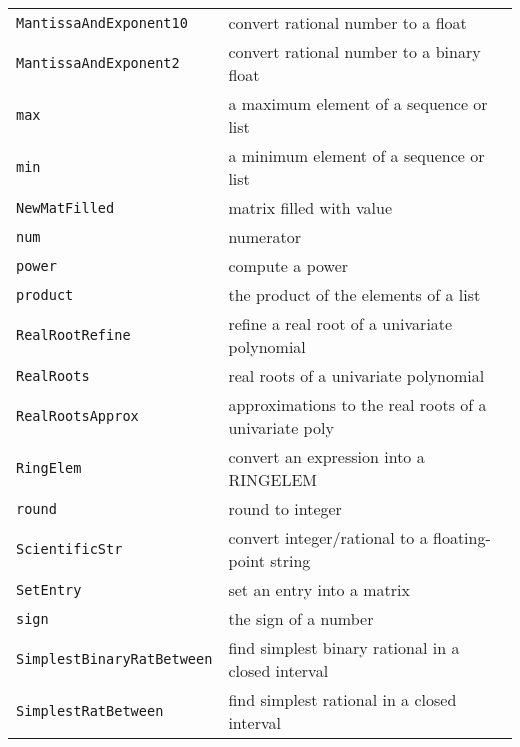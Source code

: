 \documentclass[a4paper]{mybook}
\begin{document}
\begin{center}
\begin{longtable}{ll}
{\verb~MantissaAndExponent10~} &
      convert rational number to a float\\
   
{\verb~MantissaAndExponent2~} &
      convert rational number to a binary float\\
   
{\verb~max~} &
      a maximum element of a sequence or list\\
   
{\verb~min~} &
      a minimum element of a sequence or list\\
   
{\verb~NewMatFilled~} &
      matrix filled with value\\
   
{\verb~num~} &
      numerator\\
   
{\verb~power~} &
      compute a power\\
   
{\verb~product~} &
      the product of the elements of a list\\
   
{\verb~RealRootRefine~} &
      refine a real root of a univariate polynomial\\
   
{\verb~RealRoots~} &
      real roots of a univariate polynomial\\
   
{\verb~RealRootsApprox~} &
      approximations to the real roots of a univariate poly\\
   
{\verb~RingElem~} &
      convert an expression into a RINGELEM\\
   
{\verb~round~} &
      round to integer\\
   
{\verb~ScientificStr~} &
      convert integer/rational to a floating-point string\\
   
{\verb~SetEntry~} &
      set an entry into a matrix\\
   
{\verb~sign~} &
      the sign of a number\\
   
{\verb~SimplestBinaryRatBetween~} &
      find simplest binary rational in a closed interval\\
   
{\verb~SimplestRatBetween~} &
      find simplest rational in a closed interval\\
   

\end{longtable}
\end{center}
\end{document}
